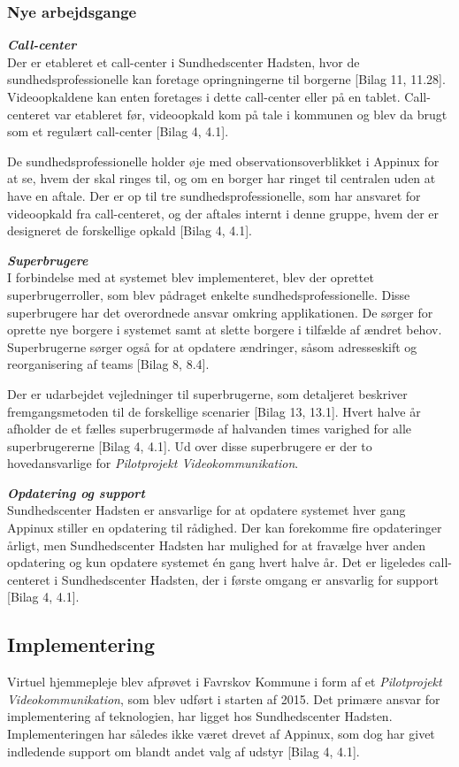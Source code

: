 \subsubsection{Nye arbejdsgange}
\textit{\textbf{Call-center}}\\
Der er etableret et call-center i Sundhedscenter Hadsten, hvor de sundhedsprofessionelle kan foretage opringningerne til borgerne [Bilag 11, 11.28]. Videoopkaldene kan enten foretages i dette call-center eller på en tablet. Call-centeret var etableret før, videoopkald kom på tale i kommunen og blev da brugt som et regulært call-center [Bilag 4, 4.1].

De sundhedsprofessionelle holder øje med observationsoverblikket i Appinux for at se, hvem der skal ringes til, og om en borger har ringet til centralen uden at have en aftale. Der er op til tre sundhedsprofessionelle, som har ansvaret for videoopkald fra call-centeret, og der aftales internt i denne gruppe, hvem der er designeret de forskellige opkald [Bilag 4, 4.1].

\textit{\textbf{Superbrugere}}\\
I forbindelse med at systemet blev implementeret, blev der oprettet superbrugerroller, som blev pådraget enkelte sundhedsprofessionelle. Disse superbrugere har det overordnede ansvar omkring applikationen. De sørger for oprette nye borgere i systemet samt at slette borgere i tilfælde af ændret behov. Superbrugerne sørger også for at opdatere ændringer, såsom adresseskift og reorganisering af teams [Bilag 8, 8.4].

Der er udarbejdet vejledninger til superbrugerne, som detaljeret beskriver fremgangsmetoden til de forskellige scenarier [Bilag 13, 13.1]. Hvert halve år afholder de et fælles superbrugermøde af halvanden times varighed for alle superbrugererne [Bilag 4, 4.1]. Ud over disse superbrugere er der to hovedansvarlige for \textit{Pilotprojekt Videokommunikation}.

\textit{\textbf{Opdatering og support}}\\
Sundhedscenter Hadsten er ansvarlige for at opdatere systemet hver gang Appinux stiller en opdatering til rådighed. Der kan forekomme fire opdateringer årligt, men Sundhedscenter Hadsten har mulighed for at fravælge hver anden opdatering og kun opdatere systemet én gang hvert halve år.
Det er ligeledes call-centeret i Sundhedscenter Hadsten, der i første omgang er ansvarlig for support [Bilag 4, 4.1]. 

\subsection{Implementering}
Virtuel hjemmepleje blev afprøvet i Favrskov Kommune i form af et \textit{Pilotprojekt Videokommunikation}, som blev udført i starten af 2015. Det primære ansvar for implementering af teknologien, har ligget hos Sundhedscenter Hadsten. Implementeringen har således ikke været drevet af Appinux, som dog har givet indledende support om blandt andet valg af udstyr [Bilag 4, 4.1].

